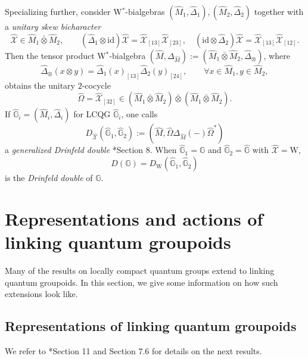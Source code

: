 \documentclass[reqno]{amsart}
\numberwithin{equation}{section}
\newcommand{\id}{\mathrm{id}}
\newcommand{\G}{\mathbb{G}}
\newcommand{\mcX}{\mathcal{X}}
\newcommand{\wh}{\widehat}
\newcommand{\ww}{\mathrm{W}}
\begin{document}
Specializing further, consider W$^*$-bialgebras $(\hat{M}_1,\hat{\Delta}_1),(\hat{M}_2,\hat{\Delta}_2)$ together with a \emph{unitary skew bicharacter}
\begin{equation}\label{EqSkewBichvN}
\wh{\mcX} \in \hat{M}_1\bar{\otimes}\hat{M}_2,\qquad  (\hat{\Delta}_1\otimes \id)\wh{\mcX} = \wh{\mcX}_{[13]}\wh{\mcX}_{[23]},\quad (\id\otimes \hat{\Delta}_2)\wh{\mcX} = \wh{\mcX}_{[13]}\wh{\mcX}_{[12]}.
\end{equation}
Then the tensor product W$^*$-bialgebra $(\hat{M},\Delta_{\hat{M}}) := (\hat{M}_1\bar{\otimes}\hat{M}_2,\hat{\Delta}_{\otimes})$, where 
\[
\hat{\Delta}_{\otimes}(x\otimes y)= \hat{\Delta}_1(x)_{[13]}\hat{\Delta}_2(y)_{[24]},\qquad \forall x\in \hat{M}_1,y\in \hat{M}_2,
\] 
obtains the unitary $2$-cocycle
\begin{equation}\label{EqCocycBichar}
\hat{\Omega} = \wh{\mcX}_{[32]} \in (\hat{M}_1\bar{\otimes}\hat{M}_2)\bar{\otimes}(\hat{M}_1\bar{\otimes}\hat{M}_2). 
\end{equation}
If $\hat{\G}_i = (\hat{M}_i,\hat{\Delta}_i)$ for LCQG $\hat{\G}_i$, one calls 
\begin{equation}
D_{\wh{\mcX}}(\hat{\G}_1,\hat{\G}_2):=(\hat{M},\hat{\Omega}\Delta_{\hat{M}}(-)\hat{\Omega}^*)
\end{equation}
a \emph{generalized Drinfeld double} \cite{BV05}*{Section 8}.  When $\hat{\G}_1 = \G$ and $\hat{\G}_2= \hat{\G}$ with $\wh{\mcX} = \ww$,
\begin{equation}
D(\G) = D_{\ww}(\hat{\G}_1,\hat{\G}_2)
\end{equation}
is the \emph{Drinfeld double} of $\G$. 

\section{Representations and actions of linking quantum groupoids}

Many of the results on locally compact quantum groups extend to linking quantum groupoids. In this section, we give some information on how such extensions look like.

\subsection{Representations of linking quantum groupoids}

We refer to \cite{DC09}*{Section 11 and Section 7.6} for details on the next results.
\end{document}
